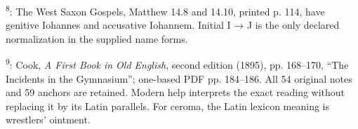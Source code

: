 \textsuperscript{8}: The West Saxon Gospels, Matthew 14.8 and 14.10, printed p. 114, have genitive Iohannes and accusative Iohannem. Initial I → J is the only declared normalization in the supplied name forms.

\textsuperscript{9}: Cook, \emph{A First Book in Old English}, second edition (1895), pp. 168–170, “The Incidents in the Gymnasium”; one-based PDF pp. 184–186. All 54 original notes and 59 anchors are retained. Modern help interprets the exact reading without replacing it by its Latin parallels. For ceroma, the Latin lexicon meaning is wrestlers’ ointment.

\endgroup

